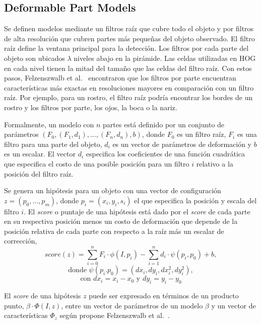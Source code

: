 \subsection{Deformable Part Models}\label{subsec:dpm}
Se definen modelos mediante un filtros raíz que cubre todo el objeto y por filtros de alta resolución que cubren partes más pequeñas del objeto observado. El filtro raíz define la ventana principal para la detección. Los filtros por cada parte del objeto son ubicados $\lambda$ niveles abajo en la pirámide. Las celdas utilizadas en HOG en cada nivel tienen la mitad del tamaño que las celdas del filtro raíz.
Con estos pasos, Felzenszwalb et al.~\cite{Felzenszwalb2010, Felzenszwalb2013} encontraron que los filtros por parte encuentran características más exactas en resoluciones mayores en comparación con un filtro raíz. Por ejemplo, para un rostro, el filtro raíz podría encontrar los bordes de un rostro y los filtros por parte, los ojos, la boca o la nariz.

Formalmente, un modelo con $n$ partes está definido por un conjunto de parámetros $(F_{0}, (F_{1},d_{1}), \dots, (F_{n}, d_{n}), b)$, donde $F_{0}$ es un filtro raíz, $F_{i}$ es una filtro para una parte del objeto, $d_{i}$ es un vector de parámetros de deformación y $b$ es un escalar. El vector $d_{i}$ especifica los coeficientes de una función cuadrática que especifica el costo de una posible posición para un filtro $i$ relativo a la posición del filtro raíz. 

Se genera un hipótesis para un objeto con una vector de configuración $z = (p_{0}, \dots, p_{m})$, donde $p_{i} = (x_{i}, y_{i}, s_{i})$ el que especifica la posición y escala del filtro $i$. El \textit{score} o puntaje de una hipótesis está dado por el \textit{score} de cada parte en su respectiva posición menos un costo de deformación que depende de la posición relativa de cada parte con respecto a la raíz más un escalar de corrección,
\begin{equation}
	\mathit{score}(z) = \sum_{i=0}^n F_{i} \cdot \phi(I, p_{i}) - \sum_{i=1}^{n} d_{i} \cdot \psi(p_{i},p_{0}) + b,
\end{equation} 
$$ \text{donde }\psi(p_i. p_0) = (dx_i, dy_i, dx^{2}_i, dy^{2}_i),$$
$$ \text{con } dx_i = x_i-x_0 \text{ y } dy_i = y_i-y_0$$

El \textit{score} de una hipótesis $z$ puede ser expresado en términos de un producto punto, $\beta \cdot \Phi(I, z)$, entre un vector de parámetros de un modelo $\beta$ y un vector de características $\Phi_z$ según propone Felzenszwalb et al.~\cite{Felzenszwalb2013}.


